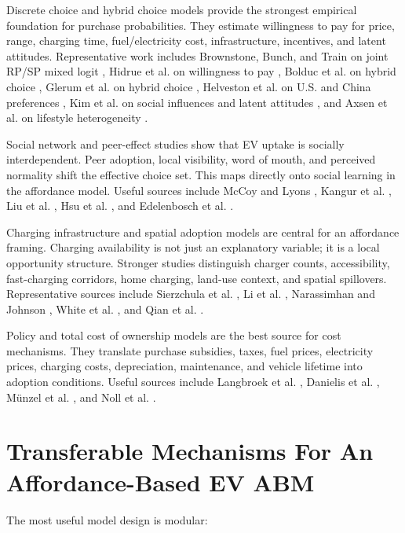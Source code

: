 \documentclass[11pt]{article}
\begin{document}
Discrete choice and hybrid choice models provide the strongest empirical
foundation for purchase probabilities. They estimate willingness to pay for
price, range, charging time, fuel/electricity cost, infrastructure, incentives,
and latent attitudes. Representative work includes Brownstone, Bunch, and Train
on joint RP/SP mixed logit \cite{brownstone2000}, Hidrue et al. on willingness
to pay \cite{hidrue2011}, Bolduc et al. on hybrid choice
\cite{bolduc2008}, Glerum et al. on hybrid choice \cite{glerum2014},
Helveston et al. on U.S. and China preferences \cite{helveston2015}, Kim et
al. on social influences and latent attitudes \cite{kim2014}, and Axsen et al.
on lifestyle heterogeneity \cite{axsen2015}.

Social network and peer-effect studies show that EV uptake is socially
interdependent. Peer adoption, local visibility, word of mouth, and perceived
normality shift the effective choice set. This maps directly onto social
learning in the affordance model. Useful sources include
McCoy and Lyons \cite{mccoy2014}, Kangur et al. \cite{kangur2017}, Liu et al.
\cite{liu2017}, Hsu et al. \cite{hsu2013}, and Edelenbosch et al.
\cite{edelenbosch2018}.

Charging infrastructure and spatial adoption models are central for an
affordance framing. Charging availability is not just an explanatory variable;
it is a local opportunity structure. Stronger studies distinguish charger
counts, accessibility, fast-charging corridors, home charging, land-use context,
and spatial spillovers. Representative sources include
Sierzchula et al. \cite{sierzchula2014}, Li et al. \cite{li2017},
Narassimhan and Johnson \cite{narassimhan2018}, White et al.
\cite{white2022}, and Qian et al. \cite{qian2024}.

Policy and total cost of ownership models are the best source for cost
mechanisms. They translate purchase subsidies, taxes, fuel prices, electricity
prices, charging costs, depreciation, maintenance, and vehicle lifetime into
adoption conditions. Useful sources include
Langbroek et al. \cite{langbroek2016}, Danielis et al.
\cite{danielis2018}, M\"{u}nzel et al. \cite{munzel2019}, and Noll et al.
\cite{noll2024}.

\section{Transferable Mechanisms For An Affordance-Based EV ABM}

The most useful model design is modular:
\end{document}
